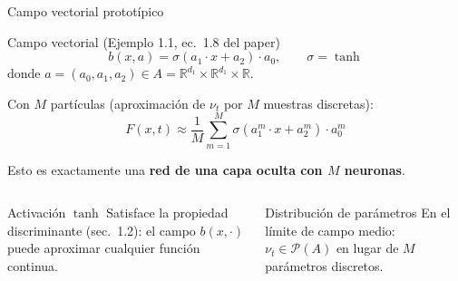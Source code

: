 \documentclass[10pt]{beamer}
\begin{document}
\begin{frame}{Campo vectorial prototípico}

\begin{block}{Campo vectorial (Ejemplo 1.1, ec.\ 1.8 del paper)}
\[
  b(x,a) = \sigma\!\left(a_1 \cdot x + a_2\right)\cdot a_0, \qquad \sigma = \tanh
\]
donde $a = (a_0, a_1, a_2)\in A = \mathbb{R}^{d_1}\times\mathbb{R}^{d_1}\times\mathbb{R}$.
\end{block}

\bigskip
Con $M$ partículas (aproximación de $\nu_t$ por $M$ muestras discretas):
\[
  F(x,t) \approx \frac{1}{M}\sum_{m=1}^{M} \sigma\!\left(a_1^m\cdot x + a_2^m\right)\cdot a_0^m
\]

\medskip
Esto es exactamente una \textbf{red de una capa oculta con $M$ neuronas}.

\bigskip
\begin{columns}
\begin{block}{Activación $\tanh$}
  Satisface la propiedad discriminante (sec.\ 1.2): el campo $b(x,\cdot)$ puede aproximar cualquier función continua.
\end{block}
\begin{block}{Distribución de parámetros}
  En el límite de campo medio: $\nu_t\in\mathcal{P}(A)$ en lugar de $M$ parámetros discretos.
\end{block}
\end{columns}
\end{frame}
\end{document}
